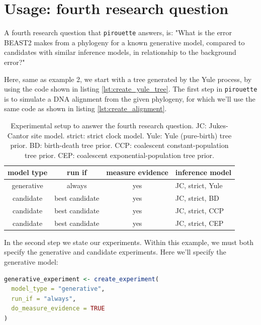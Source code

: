 \documentclass{article}
\begin{document}
\section{Usage: fourth research question}

A fourth research question that \verb;pirouette; answers, is:
"What is the error BEAST2 makes from a phylogeny for a known
generative model, compared to candidates with similar inference models,
in relationship to the background error?"

Here, same as example 2, we start with a tree generated by the Yule process,
by using the code shown in listing \ref{lst:create_yule_tree}.
The first step in \verb;pirouette; is to simulate a DNA alignment 
from the given phylogeny, for which we'll use the same code 
as shown in listing \ref{lst:create_alignment}.

\begin{table}
  \begin{tabular}{ | c | c | c | l | }
    \hline
    \textbf{model type} & \textbf{run if} & \textbf{measure evidence} & \textbf{inference model} \\ 
    \hline
    generative & always         & yes & JC, strict, Yule \\
    candidate  & best candidate & yes & JC, strict, BD \\
    candidate  & best candidate & yes & JC, strict, CCP \\
    candidate  & best candidate & yes & JC, strict, CEP \\
    \hline
  \end{tabular}
  \caption{
    Experimental setup to answer the fourth research question.
    JC: Jukes-Cantor site model.
    strict: strict clock model.
    Yule: Yule (pure-birth) tree prior.
    BD: birth-death tree prior.
    CCP: coalescent constant-population tree prior.
    CEP: coalescent exponential-population tree prior.
  }
  \label{tab:experiment_4}
\end{table}

In the second step we state our experiments. 
Within this example, we must both specify the generative and candidate 
experiments. Here we'll specify the generative model:

\begin{lstlisting}[language=R, floatplacement=H, frame=single]
generative_experiment <- create_experiment(
  model_type = "generative",
  run_if = "always",
  do_measure_evidence = TRUE
)
\end{lstlisting}
\end{document}
